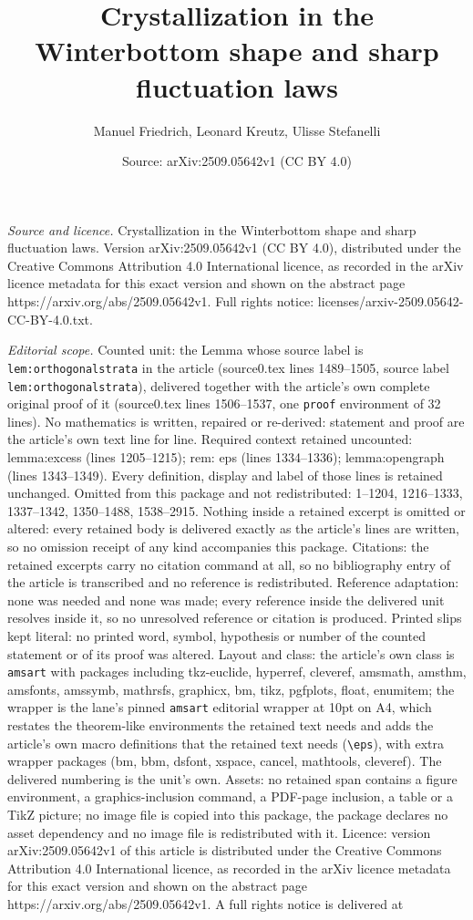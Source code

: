 \documentclass[10pt,a4paper]{amsart}
\title[Crystallization in the Winterbottom shape and sharp fluctuat]{Crystallization in the Winterbottom shape and sharp fluctuation laws}
\author{Manuel Friedrich, Leonard Kreutz, Ulisse Stefanelli}
\date{Source: arXiv:2509.05642v1 (CC BY 4.0)}
\begin{document}
\maketitle

\noindent\emph{Source and licence.} Crystallization in the Winterbottom shape and sharp fluctuation laws. Version arXiv:2509.05642v1 (CC BY 4.0), distributed under the Creative Commons Attribution 4.0 International licence, as recorded in the arXiv licence metadata for this exact version and shown on the abstract page https://arxiv.org/abs/2509.05642v1. Full rights notice: licenses/arxiv-2509.05642-CC-BY-4.0.txt.\par\smallskip

\noindent\textit{Editorial scope.} Counted unit: the Lemma whose source label is \texttt{lem:orthogonalstrata} in the article (source0.tex lines 1489--1505, source label \texttt{lem:orthogonalstrata}), delivered together with the article's own complete original proof of it (source0.tex lines 1506--1537, one \texttt{proof} environment of 32 lines). No mathematics is written, repaired or re-derived: statement and proof are the article's own text line for line. Required context retained uncounted: lemma:excess (lines 1205--1215); rem: eps (lines 1334--1336); lemma:opengraph (lines 1343--1349). Every definition, display and label of those lines is retained unchanged. Omitted from this package and not redistributed: 1--1204, 1216--1333, 1337--1342, 1350--1488, 1538--2915. Nothing inside a retained excerpt is omitted or altered: every retained body is delivered exactly as the article's lines are written, so no omission receipt of any kind accompanies this package. Citations: the retained excerpts carry no citation command at all, so no bibliography entry of the article is transcribed and no reference is redistributed. Reference adaptation: none was needed and none was made; every reference inside the delivered unit resolves inside it, so no unresolved reference or citation is produced. Printed slips kept literal: no printed word, symbol, hypothesis or number of the counted statement or of its proof was altered. Layout and class: the article's own class is \texttt{amsart} with packages including tkz-euclide, hyperref, cleveref, amsmath, amsthm, amsfonts, amssymb, mathrsfs, graphicx, bm, tikz, pgfplots, float, enumitem; the wrapper is the lane's pinned \texttt{amsart} editorial wrapper at 10pt on A4, which restates the theorem-like environments the retained text needs and adds the article's own macro definitions that the retained text needs (\texttt{\textbackslash eps}), with extra wrapper packages (bm, bbm, dsfont, xspace, cancel, mathtools, cleveref). The delivered numbering is the unit's own. Assets: no retained span contains a figure environment, a graphics-inclusion command, a PDF-page inclusion, a table or a TikZ picture; no image file is copied into this package, the package declares no asset dependency and no image file is redistributed with it. Licence: version arXiv:2509.05642v1 of this article is distributed under the Creative Commons Attribution 4.0 International licence, as recorded in the arXiv licence metadata for this exact version and shown on the abstract page https://arxiv.org/abs/2509.05642v1. A full rights notice is delivered at 
\end{document}
